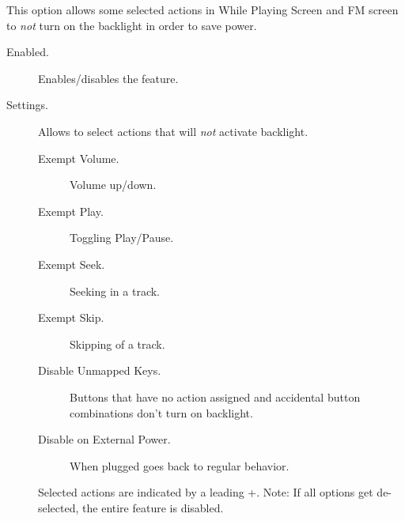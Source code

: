 \begin{description}
\begin{description}
{      \item[Backlight Exemptions]
       This option allows some selected actions in While Playing Screen and
       FM screen to \emph{not} turn on the backlight in order to save power.
      \begin{description}
        \item[Enabled.]
        Enables/disables the feature.

        \item[Settings.]
        Allows to select actions that will \emph{not} activate backlight.
                \begin{description}
                \item[Exempt Volume.]
                Volume up/down.
                \item[Exempt Play.]
                Toggling Play/Pause.
                \item[Exempt Seek.]
                Seeking in a track.
                \item[Exempt Skip.]
                Skipping of a track.
                \item[Disable Unmapped Keys.]
                Buttons that have no action assigned and accidental button
                    combinations don't turn on backlight.
                \item[Disable on External Power.]
                When plugged goes back to regular behavior.
                \end{description}
        Selected actions are indicated by a leading +.
        Note: If all options get de-selected, the entire feature is disabled.
        \end{description}




    } %



\end{description}
\end{description}
